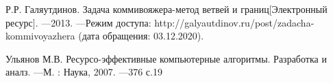 \begin{thebibliography}{9}
    \label{cha:biblio}
    
     Р.Р. Галяутдинов. Задача коммивояжера-метод ветвей и гра­ниц[Электронный ресурс]. —2013. —Режим доступа: http://galyautdinov.ru/post/zadacha-kommivoyazhera (дата обращения: 03.12.2020).
    
     Ульянов М.В. Ресурсо-эффективные компьютерные алгоритмы. Раз­работка и аналз. —М. : Наука, 2007. —376 с.19
    
\end{thebibliography}
